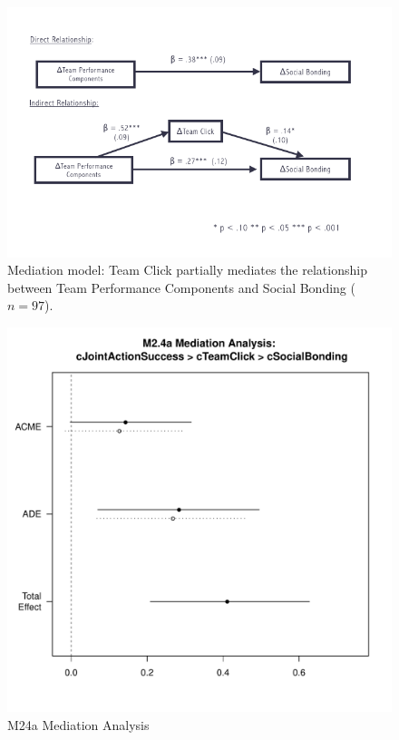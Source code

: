 \begin{CJK}{UTF8}{gbsn}
  \begin{figure}
    \centering
    \includegraphics[width=0.9\linewidth,keepaspectratio] {images/tournamentSurveyMedPrePost}
    \caption{Mediation model: Team Click partially mediates the relationship between Team Performance Components and Social Bonding ($n = 97$).}
    \label{fig:tournamentSurveyMedPrePost}
  \end{figure}



    \begin{figure}[htbp]
      \centering
      \includegraphics[scale=.5]{images/MLM24aMediationAnalysis.pdf}
      \caption{M24a Mediation Analysis}
      \label{fig:MLM24aMediationAnalysis}
    \end{figure}





\end{CJK}
